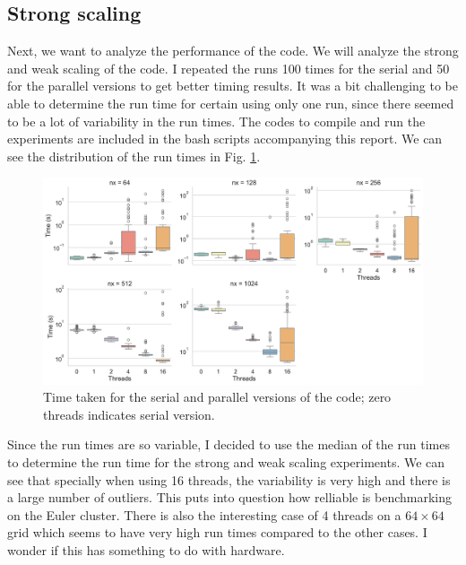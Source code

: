 \documentclass[unicode,11pt,a4paper,oneside,numbers=endperiod,openany]{scrartcl}
\begin{document}
\subsection*{Strong scaling}
Next, we want to analyze the performance of the code. We will analyze the strong
and weak scaling of the code. I repeated the runs 100 times for the serial and
50 for the parallel
versions to get better timing results.
It was a bit challenging to be able to determine the run time for certain using
only one run, since there seemed to be a lot of variability in the run times.
The codes to compile and run the experiments are included in the bash scripts
accompanying this report. We can see the distribution of the run times in Fig. \ref{im:times}.
\begin{figure}[!h]
    \centering
    \includegraphics[width=\textwidth]{../mini_app/data_var.pdf}
    \caption{Time taken for the serial and parallel versions of the code; zero threads indicates serial version.}
    \label{im:times}
\end{figure}
Since the run times are so variable, I decided to use the median of the run
times
to determine the run time for the strong and weak scaling experiments. We can
see that specially when using 16 threads, the variability is very high and there
is a large number of outliers. This puts into question how relliable is
benchmarking on the Euler cluster. There is also the interesting case of 4
threads on a $64\times64$ grid which seems to have very high run times compared
to the other cases. I wonder if this has something to do with hardware.
\end{document}
